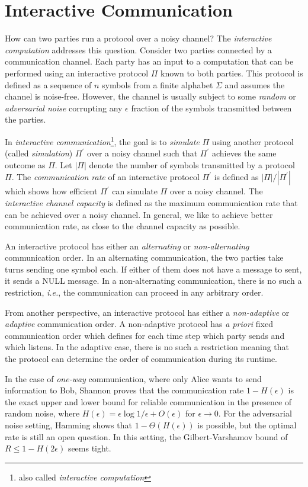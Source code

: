 \documentclass[11pt]{article}
\theoremstyle{plain}
\begin{document}
\section{Interactive Communication}

How can two parties run a protocol over a noisy channel? The \emph{interactive
	computation} addresses this question. Consider two parties connected
by a communication channel. Each party has an input to a computation
that can be performed using an interactive protocol $\Pi$ known to
both parties. This protocol is defined as a sequence of $n$ symbols
from a finite alphabet $\Sigma$ and assumes the channel is noise-free.
However, the channel is usually subject to some \emph{random} or \emph{adversarial
	noise} corrupting any $\epsilon$ fraction of the symbols transmitted
between the parties. 

In \emph{interactive communication}\footnote{also called \emph{interactive computation}},
the goal is to \emph{simulate} $\Pi$ using another protocol (called
\emph{simulation}) $\Pi^{\prime}$ over a noisy channel such that
$\Pi^{\prime}$ achieves the same outcome as $\Pi$. Let $|\Pi|$
denote the number of symbols transmitted by a protocol $\Pi$. The
\emph{communication rate} of an interactive protocol $\Pi^{\prime}$
is defined as $|\Pi|/|\Pi^{\prime}|$ which shows how efficient $\Pi^{\prime}$
can simulate $\Pi$ over a noisy channel. The \emph{interactive channel
	capacity} is defined as the maximum communication rate that can be
achieved over a noisy channel. In general, we like to achieve better
communication rate, as close to the channel capacity as possible. 

An interactive protocol has either an \emph{alternating }or \emph{non-alternating}
communication order. In an alternating communication, the two parties
take turns sending one symbol each. If either of them does not have
a message to sent, it sends a NULL message. In a non-alternating communication,
there is no such a restriction, \emph{i.e.}, the communication can
proceed in any arbitrary order. 

From another perspective, an interactive protocol has either a \emph{non-adaptive
}or \emph{adaptive} communication order. A non-adaptive protocol has
\emph{a priori} fixed communication order which defines for each time
step which party sends and which listens. In the adaptive case, there
is no such a restriction meaning that the protocol can determine the
order of communication during its runtime.

In the case of \emph{one-way }communication, where only Alice wants
to send information to Bob, Shannon proves that the communication
rate $1-H(\epsilon)$ is the exact upper and lower bound for reliable
communication in the presence of random noise, where $H(\epsilon)=\epsilon\log1/\epsilon+O(\epsilon)$
for $\epsilon\to0$. For the adversarial noise setting, Hamming shows
that $1-\Theta(H(\epsilon))$ is possible, but the optimal rate is
still an open question. In this setting, the Gilbert-Varshamov bound
of $R\leq1-H(2\epsilon)$ seems tight.
\end{document}
